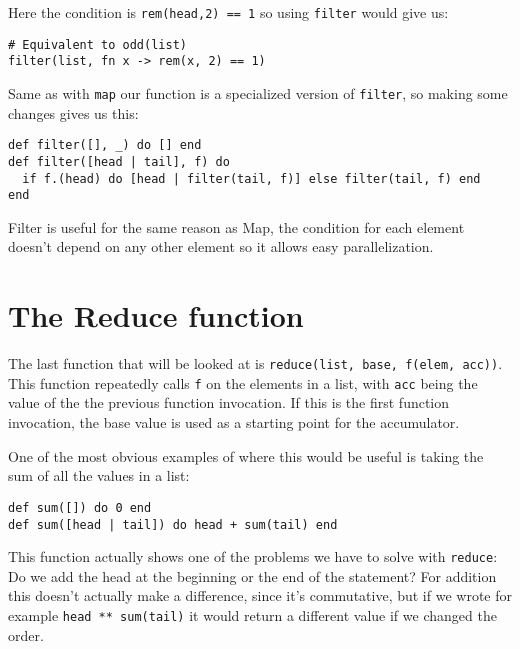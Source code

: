 \documentclass[a4paper,11pt]{article}
\begin{document}
Here the condition is \texttt{rem(head,2) == 1} so using \texttt{filter} would give us:

\begin{verbatim}
# Equivalent to odd(list)
filter(list, fn x -> rem(x, 2) == 1)
\end{verbatim}

Same as with \texttt{map} our function is a specialized version of \texttt{filter}, so making some changes gives us this:

\begin{verbatim}
def filter([], _) do [] end
def filter([head | tail], f) do
  if f.(head) do [head | filter(tail, f)] else filter(tail, f) end
end
\end{verbatim}

Filter is useful for the same reason as Map, the condition for each element doesn't depend on any other element so it allows easy parallelization.

\section*{The Reduce function}

The last function that will be looked at is \texttt{reduce(list, base, f(elem, acc))}.
This function repeatedly calls \texttt{f} on the elements in a list, with \texttt{acc} being the value of the the previous function invocation.
If this is the first function invocation, the base value is used as a starting point for the accumulator.

One of the most obvious examples of where this would be useful is taking the sum of all the values in a list:

\begin{verbatim}
def sum([]) do 0 end
def sum([head | tail]) do head + sum(tail) end
\end{verbatim}

This function actually shows one of the problems we have to solve with \texttt{reduce}: Do we add the head at the beginning or the end of the statement?
For addition this doesn't actually make a difference, since it's commutative, but if we wrote for example \texttt{head ** sum(tail)} it would return a different value if we
changed the order.
\end{document}
